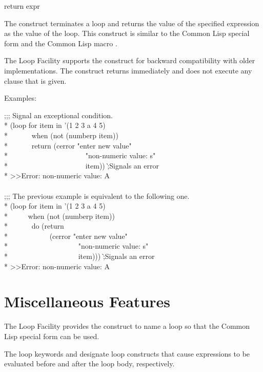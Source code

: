 \begin{defloop}
return expr

The  construct terminates a 
loop and returns the value of 
the specified expression as the value of the loop.   This construct
is similar to the Common Lisp special form  and the
Common Lisp macro .

The Loop Facility supports the  construct for backward
compatibility with older  implementations.  
The  construct returns immediately and does not execute
any  clause that is given.

Examples:
\begin{lisp}
;;; Signal an exceptional condition. \\*
(loop for item in '(1 2 3 a 4 5) \\*
~~~~~~when (not (numberp item)) \\*
~~~~~~return (cerror "enter new value" \\*
~~~~~~~~~~~~~~~~~~~~~"non-numeric value: {\Xtilde}s" \\*
~~~~~~~~~~~~~~~~~~~~~item)) \`;{\rm Signals an error} \\*
>>Error: non-numeric value: A \\
 \\
;;; The previous example is equivalent to the following one. \\*
(loop for item in '(1 2 3 a 4 5) \\*
~~~~~when (not (numberp item)) \\*
~~~~~~do (return  \\*
~~~~~~~~~~~(cerror "enter new value" \\*
~~~~~~~~~~~~~~~~~~~"non-numeric value: {\Xtilde}s" \\*
~~~~~~~~~~~~~~~~~~~item)))  \`;{\rm Signals an error} \\*
>>Error: non-numeric value: A
\end{lisp}
\end{defloop}


\section{Miscellaneous Features}
\label{LOOP-MISC-SECTION}

The Loop Facility provides the  construct to name a loop so that
the Common Lisp special form  can be used.

The loop keywords  and  designate loop constructs that cause
expressions to be evaluated before and after the loop body, respectively.


